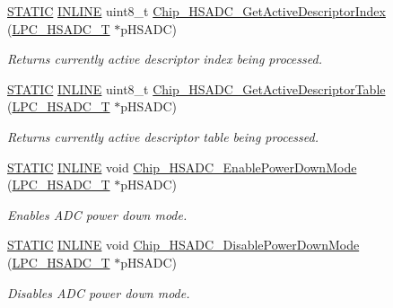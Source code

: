 \begin{DoxyCompactItemize}
\hyperlink{group___l_p_c___types___public___macros_ga10b2d890d871e1489bb02b7e70d9bdfb}{S\+T\+A\+T\+IC} \hyperlink{spifi__18xx__43xx_8h_a2eb6f9e0395b47b8d5e3eeae4fe0c116}{I\+N\+L\+I\+NE} uint8\+\_\+t \hyperlink{group___h_s_a_d_c__18_x_x__43_x_x_ga5f206e1b3c69fd04462b01963e996745}{Chip\+\_\+\+H\+S\+A\+D\+C\+\_\+\+Get\+Active\+Descriptor\+Index} (\hyperlink{struct_l_p_c___h_s_a_d_c___t}{L\+P\+C\+\_\+\+H\+S\+A\+D\+C\+\_\+T} $\ast$p\+H\+S\+A\+DC)
\begin{DoxyCompactList}\small\item\em Returns currently active descriptor index being processed. \end{DoxyCompactList}\item 
\hyperlink{group___l_p_c___types___public___macros_ga10b2d890d871e1489bb02b7e70d9bdfb}{S\+T\+A\+T\+IC} \hyperlink{spifi__18xx__43xx_8h_a2eb6f9e0395b47b8d5e3eeae4fe0c116}{I\+N\+L\+I\+NE} uint8\+\_\+t \hyperlink{group___h_s_a_d_c__18_x_x__43_x_x_gacd5c5496e4c6525848481d23d3d47907}{Chip\+\_\+\+H\+S\+A\+D\+C\+\_\+\+Get\+Active\+Descriptor\+Table} (\hyperlink{struct_l_p_c___h_s_a_d_c___t}{L\+P\+C\+\_\+\+H\+S\+A\+D\+C\+\_\+T} $\ast$p\+H\+S\+A\+DC)
\begin{DoxyCompactList}\small\item\em Returns currently active descriptor table being processed. \end{DoxyCompactList}\item 
\hyperlink{group___l_p_c___types___public___macros_ga10b2d890d871e1489bb02b7e70d9bdfb}{S\+T\+A\+T\+IC} \hyperlink{spifi__18xx__43xx_8h_a2eb6f9e0395b47b8d5e3eeae4fe0c116}{I\+N\+L\+I\+NE} void \hyperlink{group___h_s_a_d_c__18_x_x__43_x_x_gabf28fc7440ea22cdc228fb9e2107ccf0}{Chip\+\_\+\+H\+S\+A\+D\+C\+\_\+\+Enable\+Power\+Down\+Mode} (\hyperlink{struct_l_p_c___h_s_a_d_c___t}{L\+P\+C\+\_\+\+H\+S\+A\+D\+C\+\_\+T} $\ast$p\+H\+S\+A\+DC)
\begin{DoxyCompactList}\small\item\em Enables A\+DC power down mode. \end{DoxyCompactList}\item 
\hyperlink{group___l_p_c___types___public___macros_ga10b2d890d871e1489bb02b7e70d9bdfb}{S\+T\+A\+T\+IC} \hyperlink{spifi__18xx__43xx_8h_a2eb6f9e0395b47b8d5e3eeae4fe0c116}{I\+N\+L\+I\+NE} void \hyperlink{group___h_s_a_d_c__18_x_x__43_x_x_ga84152d56e357d1b892d32aaa7b88621e}{Chip\+\_\+\+H\+S\+A\+D\+C\+\_\+\+Disable\+Power\+Down\+Mode} (\hyperlink{struct_l_p_c___h_s_a_d_c___t}{L\+P\+C\+\_\+\+H\+S\+A\+D\+C\+\_\+T} $\ast$p\+H\+S\+A\+DC)
\begin{DoxyCompactList}\small\item\em Disables A\+DC power down mode. \end{DoxyCompactList}\item 

\end{DoxyCompactItemize}
